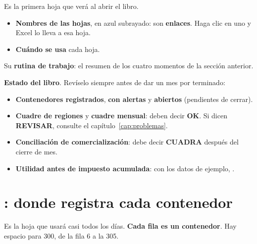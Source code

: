 Es la primera hoja que verá al abrir el libro.

\begin{itemize}
  \item {} \textbf{Nombres de las hojas}, en azul subrayado: son \textbf{enlaces}. Haga clic en uno y Excel lo lleva a esa hoja.
  \item {} \textbf{Cuándo se usa} cada hoja.
\end{itemize}

 Su \textbf{rutina de trabajo}: el resumen de los cuatro momentos de la sección anterior.

 \textbf{Estado del libro}. Revíselo siempre antes de dar un mes por terminado:
\begin{itemize}
  \item \textbf{Contenedores registrados}, \textbf{con alertas} y \textbf{abiertos} (pendientes de cerrar).
  \item \textbf{Cuadre de regiones} y \textbf{cuadre mensual}: deben decir \textcolor{verde}{\textbf{OK}}. Si dicen \textcolor{rojo}{\textbf{REVISAR}},
        consulte el capítulo~\ref{cap:problemas}.
  \item \textbf{Conciliación de comercialización}: debe decir \textcolor{verde}{\textbf{CUADRA}} después del cierre de mes.
  \item \textbf{Utilidad antes de impuesto acumulada}: con los datos de ejemplo, \vUAItotal.
\end{itemize}

\section{: donde registra cada contenedor}

Es la hoja que usará casi todos los días. \textbf{Cada fila es un contenedor}. Hay espacio para 300, de la fila 6 a la 305.

